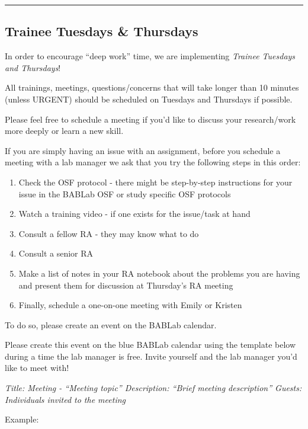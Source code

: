 \documentclass[]{book}
\providecommand{\tightlist}{%
  \setlength{\itemsep}{0pt}\setlength{\parskip}{0pt}}
\begin{document}
\begin{center}\rule{0.5\linewidth}{0.5pt}\end{center}

\subsection{Trainee Tuesdays \&
Thursdays}\label{trainee-tuesdays-thursdays}

In order to encourage ``deep work'' time, we are implementing
\emph{Trainee Tuesdays and Thursdays}!

All trainings, meetings, questions/concerns that will take longer than
10 minutes (unless URGENT) should be scheduled on Tuesdays and Thursdays
if possible.

Please feel free to schedule a meeting if you'd like to discuss your
research/work more deeply or learn a new skill.

If you are simply having an issue with an assignment, before you
schedule a meeting with a lab manager we ask that you try the following
steps in this order:

\begin{enumerate}
\def\labelenumi{\arabic{enumi}.}
\tightlist
\item
  Check the OSF protocol - there might be step-by-step instructions for
  your issue in the BABLab OSF or study specific OSF protocols
\item
  Watch a training video - if one exists for the issue/task at hand
\item
  Consult a fellow RA - they may know what to do
\item
  Consult a senior RA
\item
  Make a list of notes in your RA notebook about the problems you are
  having and present them for discussion at Thursday's RA meeting
\item
  Finally, schedule a one-on-one meeting with Emily or Kristen
\end{enumerate}

To do so, please create an event on the BABLab calendar.

Please create this event on the blue BABLab calendar using the template
below during a time the lab manager is free. Invite yourself and the lab
manager you'd like to meet with!

\emph{Title: Meeting - ``Meeting topic'' Description: ``Brief meeting
description'' Guests: Individuals invited to the meeting}

Example:
\end{document}
